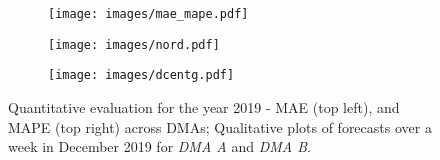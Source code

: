 \begin{figure}[htbp] 
    \centering
    \begin{subfigure}[t]{\linewidth} 
        \texttt{[image: images/mae\_mape.pdf]} 
        \label{Fig:mape}
    \end{subfigure}


    \begin{subfigure}[t]{0.48\linewidth} 
        \texttt{[image: images/nord.pdf]} 
    \end{subfigure}
    \begin{subfigure}[t]{0.48\linewidth} 
        \texttt{[image: images/dcentg.pdf]} 

    \end{subfigure}
    \caption{Quantitative evaluation for the year 2019 - MAE (top left), and MAPE (top right) across DMAs; Qualitative plots of forecasts over a week in December 2019 for \textit{DMA A} and \textit{DMA B}.}

    \label{Fig:metrics_plots}
\end{figure} 
